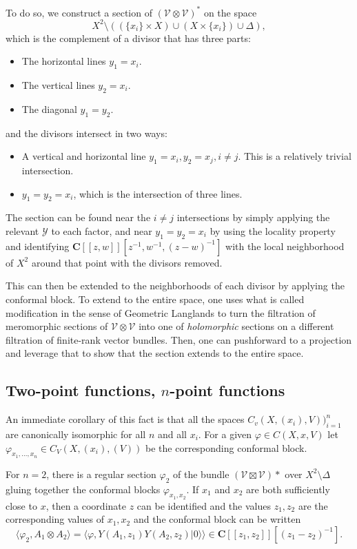 \documentclass{article}
\newcommand{\CC}{\mathbold{C}}
\newcommand{\vac}{|0\rangle}
\newcommand{\Vv}{\mathcal{V}}
\newcommand{\Yy}{\mathcal{Y}}
\begin{document}
To do so, we construct a section of $(\Vv \otimes \Vv)^*$ on the space
\[X^2 \setminus(  (\{x_i\} \times X) \cup (X \times \{x_i\}) \cup \Delta), \]
which is the complement of a divisor that has three parts:
\begin{itemize}
\item The horizontal lines $y_1=x_i$.
\item The vertical lines $y_2=x_i$.
\item The diagonal $y_1=y_2$.
\end{itemize}
and the divisors intersect in two ways:
\begin{itemize}
\item A vertical and horizontal line $y_1=x_i,y_2=x_j,i \ne j$.  This is a relatively trivial intersection.
\item $y_1=y_2=x_i$, which is the intersection of three lines.
\end{itemize}
The section can be found near the $i \ne j$ intersections by simply applying the relevant $\Yy$ to each factor, and near $y_1=y_2=x_i$ by using the locality property and identifying $\CC[[z,w]][z^{-1},w^{-1},(z-w)^{-1}]$ with the local neighborhood of $X^2$ around that point with the divisors removed.

This can then be extended to the neighborhoods of each divisor by applying the conformal block.  To extend to the entire space, one uses what is called modification in the sense of Geometric Langlands to turn the filtration of meromorphic sections of $\Vv \otimes \Vv$ into one of \textit{holomorphic} sections on a different filtration of finite-rank vector bundles.  Then, one can pushforward to a projection and leverage that to show that the section extends to the entire space.

\subsection{Two-point functions, $n$-point functions}
An immediate corollary of this fact is that all the spaces $C_v(X,(x_i),V))_{i=1}^n$ are canonically isomorphic for all $n$ and all $x_i$.  For a given $\varphi \in C(X,x,V)$ let $\varphi_{x_1,...,x_n} \in C_V(X,(x_i),(V))$ be the corresponding conformal block.

For $n=2$, there is a regular section $\varphi_2$ of the bundle $(\Vv \boxtimes \Vv)*$ over $X^2 \setminus \Delta$ gluing together the conformal blocks $\varphi_{x_1,x_2}$.  If $x_1$ and $x_2$ are both sufficiently close to $x$, then a coordinate $z$ can be identified and the values $z_1,z_2$ are the corresponding values of $x_1,x_2$ and the conformal block can be written
\[\langle \varphi_2,A_1 \otimes A_2 \rangle = \langle \varphi, Y(A_1,z_1)Y(A_2,z_2)\vac \rangle \in \CC[[z_1,z_2]][(z_1-z_2)^{-1}]. \]
\end{document}
